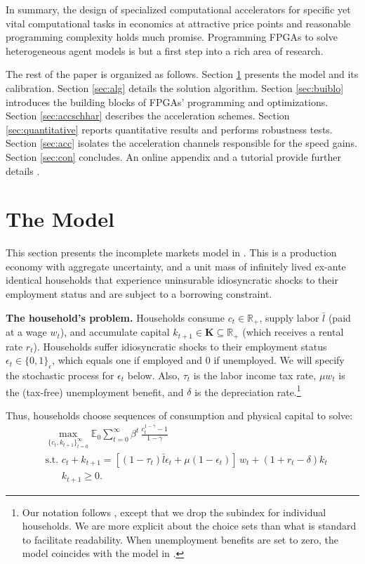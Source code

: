 \documentclass[12pt,american]{article}
\newcommand{\kset}{\mathbf{K}}
\newcommand{\idset}{\{0,1\}_{\epsilon}}
\newcommand{\lbar}{\bar{l}}
\begin{document}
In summary, the design of specialized computational accelerators for specific yet vital computational tasks in economics at attractive price points and reasonable programming complexity holds much promise. Programming FPGAs to solve heterogeneous agent models is but a first step into a rich area of research.

The rest of the paper is organized as follows. Section \ref{sec:mod} presents the model and its calibration. Section \ref{sec:alg} details the solution algorithm. Section \ref{sec:buiblo} introduces the building blocks of FPGAs' programming and optimizations. Section \ref{sec:accschhar} describes the acceleration schemes. Section \ref{sec:quantitative} reports quantitative results and performs robustness tests. Section \ref{sec:acc} isolates the acceleration channels responsible for the speed gains. Section \ref{sec:con} concludes. An online appendix and a tutorial provide further details \citep{FPGAtutorial23}.

\section{The Model}\label{sec:mod}

This section presents the incomplete markets model in \citet{DenHaan2010_model}. This is a production economy with aggregate uncertainty, and a unit mass of infinitely lived ex-ante identical households that experience uninsurable idiosyncratic shocks to their employment status and are subject to a borrowing constraint.

\textbf{The household's problem.} Households consume $c_{t}\in\mathbb{R}_{+}$, supply labor $\lbar$ (paid at a wage $w_t$), and accumulate capital $k_{t+1}\in \kset\subseteq\mathbb{R}_{+}$ (which receives a rental rate $r_{t}$). Households suffer idiosyncratic shocks to their employment status $\epsilon_{t}\in \idset$, which equals one if employed and $0$ if unemployed. We will specify the stochastic process for $\epsilon_{t}$ below. Also, $\tau_{t}$ is the labor income tax rate, $\mu w_{t}$ is the (tax-free) unemployment benefit, and $\delta$ is the depreciation rate.\footnote{Our notation follows \citet{DenHaan2010_model}, except that we drop the subindex for individual households. We are more explicit about the choice sets than what is standard to facilitate readability. When unemployment benefits are set to zero, the model coincides with the model in \citet{KrusellSmith1998}.}

Thus, households choose sequences of consumption and physical capital to solve:
\begin{align}
& \max_{\{c_{t},k_{t+1}\}_{t=0}^{\infty}} \mathbb{E}_{0}  \sum_{t=0}^{\infty} \beta^{t} \,\frac{c_{t}^{1-\gamma}-1}{1-\gamma}\label{eq:indage}\\
&\text{s.t.}\,\, c_{t}+k_{t+1}= \left [ (1-\tau_{t})\lbar \epsilon_{t} +\mu(1-\epsilon_{t}) \right]\,w_{t} + (1+r_{t}-\delta)k_{t} \label{eq:bc}\\
&\phantom{\text{s.t.}}\,\,k_{t+1}\geq 0 \label{eq:k}.
\end{align}
\end{document}
